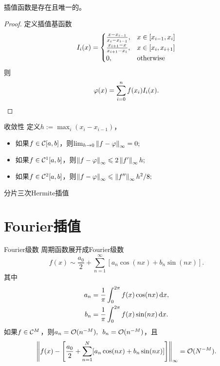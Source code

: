 \begin{theorem}
    {}{}
    插值函数是存在且唯一的。
\end{theorem}

\begin{proof}
    定义插值基函数
    \begin{equation}
        I_i(x)=\begin{cases}
            \frac{x-x_{i-1}}{x_i-x_{i-1}},&x\in[x_{i-1},x_i]\\
            \frac{x_{i+1}-x}{x_{i+1}-x_i},&x\in[x_i,x_{i+1}]\\
            0,&\mathrm{otherwise}
        \end{cases}
    \end{equation}
    则
    \begin{equation}
        \varphi(x)=\sum_{i=0}^nf(x_i)I_i(x).
        \qedhere
    \end{equation}
\end{proof}

\begin{theorem}
    {收敛性}{}
    定义$h:=\max_i(x_i-x_{i-1})$，
    \begin{itemize}
        \item 如果$f\in\mathcal C[a,b]$，则$\lim_{h\to0}\left\lVert f-\varphi\right\rVert_\infty=0;$
        \item 如果$f\in\mathcal C^1[a,b]$，则$\left\lVert f-\varphi\right\rVert_\infty\leqslant 2\left\lVert f'\right\rVert_\infty h;$
        \item 如果$f\in\mathcal C^2[a,b]$，则$\left\lVert f-\varphi\right\rVert_\infty\leqslant \left\lVert f''\right\rVert_\infty h^2/8;$
    \end{itemize}
\end{theorem}

\begin{definition}
    {分片三次Hermite插值}{}

\end{definition}

\section{Fourier插值}
\label{sec:Fourier interpolation}

\begin{definition}
    {Fourier级数}{}
    周期函数展开成Fourier级数
    \begin{equation}
        f(x)\sim\frac{a_0}2+\sum_{n=1}^\infty[a_n\cos(nx)+b_n\sin(nx)].
    \end{equation}
    其中
    \begin{subequations}
        \begin{align}
            a_n&=\frac1\pi\int_0^{2\pi}f(x)\cos(nx)\mathop{}\!\mathrm{d} x,\\
            b_n&=\frac1\pi\int_0^{2\pi}f(x)\sin(nx)\mathop{}\!\mathrm{d} x.
        \end{align}
    \end{subequations}
    \tcblower
    如果$f\in\mathcal C^M$，则$a_n=\mathcal O(n^{-M}),\enspace b_n=\mathcal O(n^{-M})$，且
    \[
        \left\lVert f(x)-\left[\frac{a_0}2+\sum_{n=1}^N[a_n\cos(nx)+b_n\sin(nx)]\right]\right\rVert_\infty=\mathcal O(N^{-M}).
    \] 
\end{definition}


